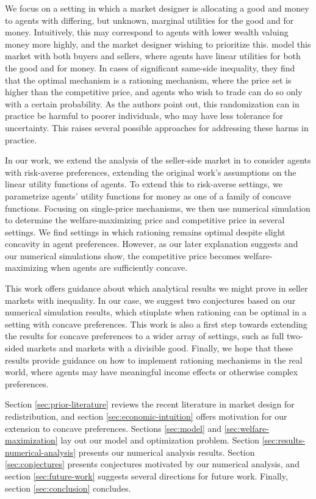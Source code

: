 \documentclass[AER]{AEA}
\begin{document}
We focus on a setting in which a market designer is allocating a good and money to agents with differing, but unknown, marginal utilities for the good and for money. Intuitively, this may correspond to agents with lower wealth valuing money more highly, and the market designer wishing to prioritize this. \cite{dworczak-2020} model this market with both buyers and sellers, where agents have linear utilities for both the good and for money. In cases of significant same-side inequality, they find that the optimal mechanism is a rationing mechanism, where the price set is higher than the competitive price, and agents who wish to trade can do so only with a certain probability. As the authors point out, this randomization can in practice be harmful to poorer individuals, who may have less tolerance for uncertainty. This raises several possible approaches for addressing these harms in practice.

In our work, we extend the analysis of the seller-side market in \cite{dworczak-2020} to consider agents with risk-averse preferences, extending the original work's assumptions on the linear utility functions of agents. To extend this to risk-averse settings, we parametrize agents' utility functions for money as one of a family of concave functions. Focusing on single-price mechanisms, we then use numerical simulation to determine the welfare-maximizing price and competitive price in several settings. We find settings in which rationing remains optimal despite slight concavity in agent preferences. However, as our later explanation suggests and our numerical simulations show, the competitive price becomes welfare-maximizing when agents are sufficiently concave.

This work offers guidance about which analytical results we might prove in seller markets with inequality. In our case, we suggest two conjectures based on our numerical simulation results, which stiuplate when rationing can be optimal in a setting with concave preferences. This work is also a first step towards extending the results for concave preferences to a wider array of settings, such as full two-sided markets and markets with a divisible good. Finally, we hope that these results provide guidance on how to implement rationing mechanisms in the real world, where agents may have meaningful income effects or otherwise complex preferences.

Section \ref{sec:prior-literature} reviews the recent literature in market design for redistribution, and section \ref{sec:economic-intuition} offers motivation for our extension to concave preferences. Sections \ref{sec:model} and \ref{sec:welfare-maximization} lay out our model and optimization problem. Section \ref{sec:results-numerical-analysis} presents our numerical analysis results. Section \ref{sec:conjectures} presents conjectures motivated by our numerical analysis, and section \ref{sec:future-work} suggests several directions for future work. Finally, section \ref{sec:conclusion} concludes.
\end{document}
